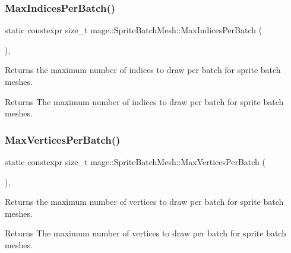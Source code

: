 \subsubsection{\texorpdfstring{Max\+Indices\+Per\+Batch()}{MaxIndicesPerBatch()}}
{\footnotesize\ttfamily static constexpr size\+\_\+t mage\+::\+Sprite\+Batch\+Mesh\+::\+Max\+Indices\+Per\+Batch (\begin{DoxyParamCaption}{ }\end{DoxyParamCaption})\hspace{0.3cm}{\ttfamily [static]}, {\ttfamily [noexcept]}}

Returns the maximum number of indices to draw per batch for sprite batch meshes.

\begin{DoxyReturn}{Returns}
The maximum number of indices to draw per batch for sprite batch meshes. 
\end{DoxyReturn}
\hypertarget{classmage_1_1_sprite_batch_mesh_a63c6b47e82be3175891ceb41847ed64d}{}\label{classmage_1_1_sprite_batch_mesh_a63c6b47e82be3175891ceb41847ed64d} 
\subsubsection{\texorpdfstring{Max\+Vertices\+Per\+Batch()}{MaxVerticesPerBatch()}}
{\footnotesize\ttfamily static constexpr size\+\_\+t mage\+::\+Sprite\+Batch\+Mesh\+::\+Max\+Vertices\+Per\+Batch (\begin{DoxyParamCaption}{ }\end{DoxyParamCaption})\hspace{0.3cm}{\ttfamily [static]}, {\ttfamily [noexcept]}}

Returns the maximum number of vertices to draw per batch for sprite batch meshes.

\begin{DoxyReturn}{Returns}
The maximum number of vertices to draw per batch for sprite batch meshes. 
\end{DoxyReturn}
\hypertarget{classmage_1_1_sprite_batch_mesh_af97c5b660417a70f9a0365c74279ef3e}{}\label{classmage_1_1_sprite_batch_mesh_af97c5b660417a70f9a0365c74279ef3e} 
